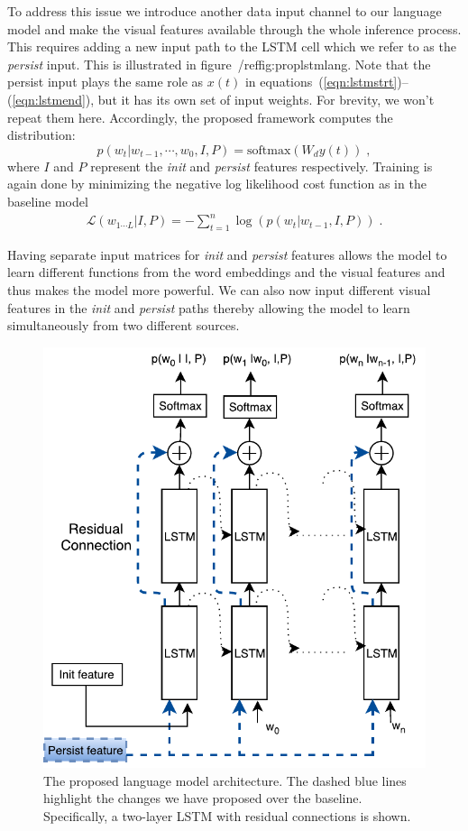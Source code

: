 To address this issue we introduce another data input channel to our
language model and make the visual features available through the whole
inference process.
This requires adding a new input path to the LSTM cell which we refer to as the
\emph{persist} input.
This is illustrated in figure~/ref{fig:proplstmlang}.
Note that the persist input plays the same role as $x(t)$ in
equations~(\ref{eqn:lstmstrt})--(\ref{eqn:lstmend}), but it has its own set of
input weights.
For brevity, we won't repeat them here.
Accordingly, the proposed framework computes the distribution:
\begin{equation}
p(w_t | w_{t-1},\cdots,w_0, I, P) = \text{softmax}(W_d y(t)) \;,
\end{equation}
\noindent where $I$ and $P$ represent the \emph{init} and \emph{persist}
features respectively.
Training is again done by minimizing the negative log likelihood cost function
as in the baseline model
\begin{align}
  \mathcal{L}(w_{1\cdots L} | I,P) = -\sum_{t=1}^n \log(p(w_t|w_{t-1},I,P)) \; .
\end{align}

Having separate input matrices for \emph{init} and \emph{persist} features
allows the model to learn different functions from the word embeddings and the
visual features and thus makes the model more powerful.
We can also now input different visual features in the \emph{init} and
\emph{persist} paths thereby allowing the model to learn simultaneously from two
different sources.

\begin{figure}[t]
\begin{center}
  \includegraphics[width=0.7\linewidth]{images/MultilayerResidualLSTM.pdf}
\end{center}
\vspace*{-4mm}
\caption{The proposed language model architecture. The dashed blue lines
        highlight the changes we have proposed over the baseline. 
        Specifically, a two-layer LSTM with residual connections is
        shown.}
\label{fig:proplstmlang}
\end{figure}

